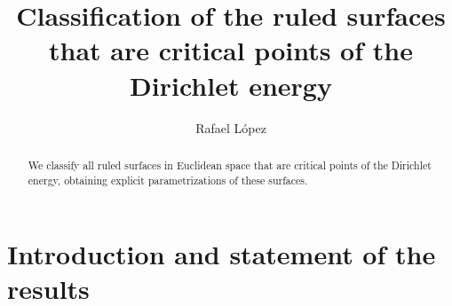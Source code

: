 \documentclass[12pt,a4paper,reqno]{amsart}
\title[Ruled surfaces that are critical points of the Dirichlet energy]{Classification of the ruled surfaces that are critical points of the Dirichlet energy}
\author[Rafael L\'opez]{Rafael L\'opez}
\date{}
\begin{document}
\begin{abstract}
We classify all ruled surfaces in Euclidean space that are critical points of the Dirichlet energy, obtaining explicit parametrizations of these surfaces. \end{abstract}

\maketitle



 
 
 
 
 
	
 

 

 
\section{Introduction and statement of the results} \label{intro}
\end{document}
